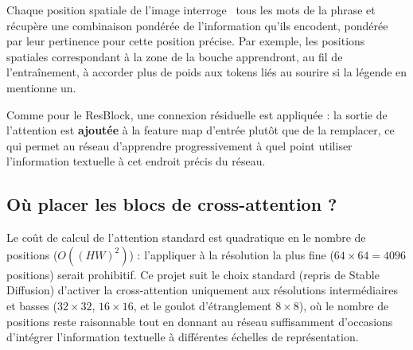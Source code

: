 \begin{intuition}
Chaque position spatiale de l'image \og interroge \fg\ tous les mots de la phrase et récupère une
combinaison pondérée de l'information qu'ils encodent, pondérée par leur pertinence pour cette
position précise. Par exemple, les positions spatiales correspondant à la zone de la bouche
apprendront, au fil de l'entraînement, à accorder plus de poids aux tokens liés au sourire si la
légende en mentionne un.
\end{intuition}

Comme pour le ResBlock, une connexion résiduelle est appliquée : la sortie de l'attention est
\textbf{ajoutée} à la feature map d'entrée plutôt que de la remplacer, ce qui permet au réseau
d'apprendre progressivement à quel point utiliser l'information textuelle à cet endroit précis du
réseau.

\subsection{Où placer les blocs de cross-attention ?}

Le coût de calcul de l'attention standard est quadratique en le nombre de positions
($O((HW)^2)$) : l'appliquer à la résolution la plus fine ($64\times64 = 4096$ positions) serait
prohibitif. Ce projet suit le choix standard (repris de Stable Diffusion) d'activer la cross-attention
uniquement aux résolutions intermédiaires et basses ($32\times32$, $16\times16$, et le goulot
d'étranglement $8\times8$), où le nombre de positions reste raisonnable tout en donnant au réseau
suffisamment d'occasions d'intégrer l'information textuelle à différentes échelles de représentation.
